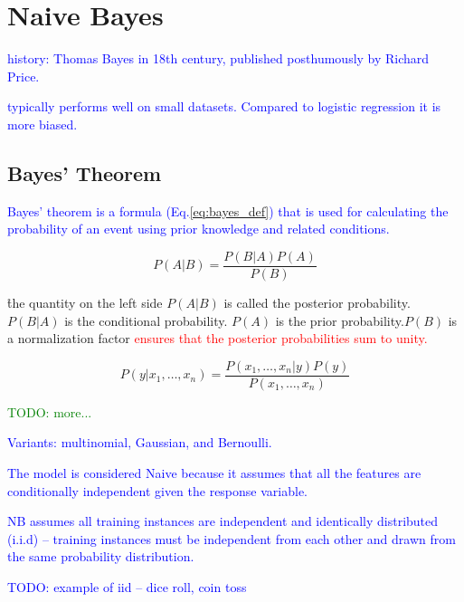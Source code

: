 \section{Naive Bayes}

\textcolor{blue}{history: Thomas Bayes in 18th century, published posthumously by Richard Price.}

\textcolor{blue}{typically performs well on small datasets. Compared to logistic regression it is more biased.}

\subsection{Bayes' Theorem}

\textcolor{blue}{Bayes' theorem is a formula (Eq.\ref{eq:bayes_def}) that is used for calculating the probability of an event using prior knowledge and related conditions.}

\begin{equation}
{P(A|B)=\frac{P(B|A)P(A)}{P(B)}}
\label{eq:bayes_def}
\end{equation}

\r{the quantity on the left side $P(A|B)$ is called the posterior probability. $P(B|A)$ is the conditional probability. $P(A)$ is the prior probability.$P(B)$ is a normalization factor \textcolor{red}{ensures that the posterior probabilities sum to unity.}}

\begin{equation}
{P(y|x_1,\dots,x_n)=\frac{P(x_1,\dots,x_n|y)P(y)}{P(x_1,\dots,x_n)}}
\label{eq:bayes_exp_def}
\end{equation}

\textcolor{green}{TODO: more...}

\textcolor{blue}{Variants: multinomial, Gaussian, and Bernoulli.}


\textcolor{blue}{The model is considered Naive because it assumes that all the features are conditionally independent given the response variable.}


\textcolor{blue}{NB assumes all training instances are {independent and identically distributed (i.i.d)} -- training instances must be independent from each other and drawn from the same probability distribution.}

\textcolor{blue}{TODO: example of iid -- dice roll, coin toss}

